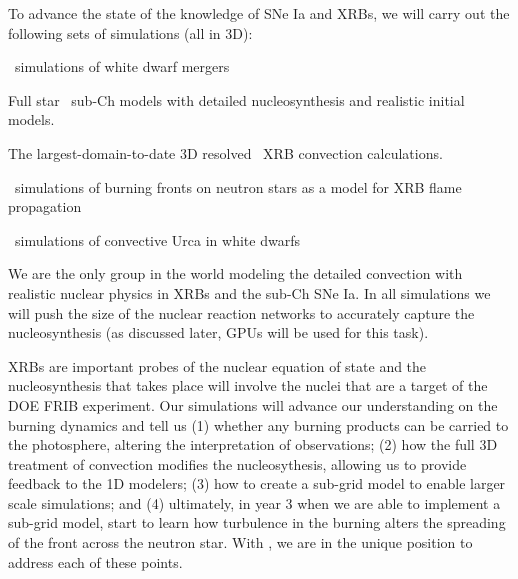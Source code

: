 \documentclass[11pt,letterpaper,english]{article}
\begin{document}
To advance the state of the knowledge of SNe Ia and XRBs, we will
carry out the following sets of simulations (all in 3D):
\begin{tightitem}
\item \castro\ simulations of white dwarf mergers
\item Full star \maestro\ sub-Ch models with 
  detailed nucleosynthesis and realistic initial models.
\item The largest-domain-to-date 3D resolved \maestro\ XRB convection
  calculations.
\item \castro\ simulations of burning fronts on neutron stars
  as a model for XRB flame propagation
\item \maestro\ simulations of convective Urca in white dwarfs
\end{tightitem}

We are the only group in the world modeling the detailed convection
with realistic nuclear physics in XRBs and the sub-Ch SNe Ia.
In all simulations we will push the size of the nuclear reaction networks
to accurately capture the nucleosynthesis (as discussed later, GPUs will
be used for this task).

XRBs are important probes of the nuclear equation of 
state and the nucleosynthesis that
takes place will involve the nuclei that are a target of the DOE FRIB
experiment.  Our simulations will advance our understanding on the
burning dynamics and tell us (1) whether any burning products can be
carried to the photosphere, altering the interpretation of
observations; (2) how the full 3D treatment of convection modifies the
nucleosythesis, allowing us to provide feedback to the 1D modelers;
(3) how to create a sub-grid model to enable larger scale simulations;
and (4) ultimately, in year 3 when we are able to implement a sub-grid
model, start to learn how turbulence in the burning alters the
spreading of the front across the neutron star.  With \maestro, we are
in the unique position to address each of these points.
\end{document}
